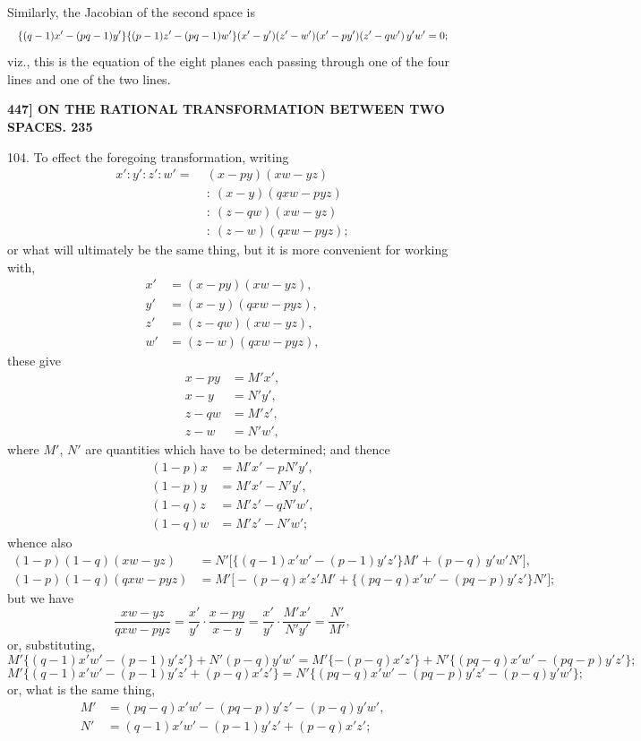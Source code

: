 \documentclass[11pt]{article}
\begin{document}
Similarly, the Jacobian of the second space is
\[ \resizebox{\textwidth}{!}{$\displaystyle \{(q-1)x' - (pq-1)y'\}\{(p-1)z' - (pq-1)w'\}(x'-y')(z'-w')(x'-py')(z'-qw')\,y'w' = 0;$} \]
viz., this is the equation of the eight planes each passing through one of the four
lines and one of the two lines.

\medskip
\noindent\textbf{447] \quad ON THE RATIONAL TRANSFORMATION BETWEEN TWO SPACES. \hfill 235}

\medskip

104. To effect the foregoing transformation, writing
\begin{align*}
x' : y' : z' : w' = \;& (x - py)(xw - yz)\\
& :\ (x - y)(qxw - pyz)\\
& :\ (z - qw)(xw - yz)\\
& :\ (z - w)(qxw - pyz);
\end{align*}
or what will ultimately be the same thing, but it is more convenient for working with,
\begin{align*}
x' &= (x - py)(xw - yz),\\
y' &= (x - y)(qxw - pyz),\\
z' &= (z - qw)(xw - yz),\\
w' &= (z - w)(qxw - pyz),
\end{align*}
these give
\begin{align*}
x - py &= M'x',\\
x - y &= N'y',\\
z - qw &= M'z',\\
z - w &= N'w',
\end{align*}
where $M'$, $N'$ are quantities which have to be determined; and thence
\begin{align*}
(1-p)x &= M'x' - pN'y',\\
(1-p)y &= M'x' - N'y',\\
(1-q)z &= M'z' - qN'w',\\
(1-q)w &= M'z' - N'w';
\end{align*}
whence also
\begin{align*}
(1-p)(1-q)(xw - yz) &= N'\bigl[\{(q-1)x'w' - (p-1)y'z'\}M' + (p-q)\,y'w'N'\bigr],\\
(1-p)(1-q)(qxw - pyz) &= M'\bigl[-(p-q)x'z'M' + \{(pq-q)x'w' - (pq-p)y'z'\}N'\bigr];
\end{align*}
but we have
\[ \frac{xw - yz}{qxw - pyz} = \frac{x'}{y'}\cdot\frac{x-py}{x-y} = \frac{x'}{y'}\cdot\frac{M'x'}{N'y'} = \frac{N'}{M'}, \]
or, substituting,
\[ M'\{(q-1)x'w' - (p-1)y'z'\} + N'(p-q)y'w' = M'\{-(p-q)x'z'\} + N'\{(pq-q)x'w' - (pq-p)y'z'\}; \]
\[ M'\{(q-1)x'w' - (p-1)y'z' + (p-q)x'z'\} = N'\{(pq-q)x'w' - (pq-p)y'z' - (p-q)y'w'\}; \]
or, what is the same thing,
\begin{align*}
M' &= (pq - q)x'w' - (pq - p)y'z' - (p - q)y'w',\\
N' &= (q - 1)x'w' - (p - 1)y'z' + (p - q)x'z';
\end{align*}
\end{document}

